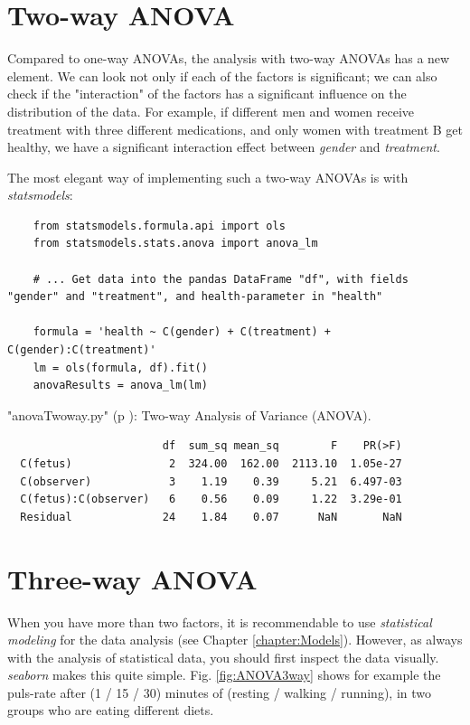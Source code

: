 \section{Two-way ANOVA} \label{sec:anovaTwoWay}  

Compared to one-way ANOVAs, the analysis with two-way ANOVAs has a new element. We can look not only if each of the factors is significant; we can also check if the "interaction" of the factors has a significant influence on the distribution of the data. For example, if different men and women receive treatment with three different medications, and only women with treatment B get healthy, we have a significant interaction effect between \emph{gender} and \emph{treatment}.

The most elegant way of implementing such a two-way ANOVAs is with \emph{statsmodels}:

\begin{lstlisting}
    from statsmodels.formula.api import ols
    from statsmodels.stats.anova import anova_lm

    # ... Get data into the pandas DataFrame "df", with fields "gender" and "treatment", and health-parameter in "health"
    
    formula = 'health ~ C(gender) + C(treatment) + C(gender):C(treatment)'
    lm = ols(formula, df).fit()
    anovaResults = anova_lm(lm)
\end{lstlisting}

\PyImg "anovaTwoway.py" (p \pageref{py:anovaTwoway}): Two-way Analysis of Variance (ANOVA).

\begin{verbatim}
                        df  sum_sq mean_sq        F    PR(>F)
  C(fetus)               2  324.00  162.00  2113.10  1.05e-27
  C(observer)            3    1.19    0.39     5.21  6.497-03
  C(fetus):C(observer)   6    0.56    0.09     1.22  3.29e-01
  Residual              24    1.84    0.07      NaN       NaN
\end{verbatim}

\section{Three-way ANOVA} \label{sec:anovaThreeWay} 

When you have more than two factors, it is recommendable to use \emph{statistical modeling} for the data analysis (see Chapter \ref{chapter:Models}). However, as always with the analysis of statistical data, you should first inspect the data visually. \emph{seaborn} makes this quite simple. Fig. \ref{fig:ANOVA3way} shows for example the puls-rate after (1 / 15 / 30) minutes of (resting / walking / running), in two groups who are eating different diets.

